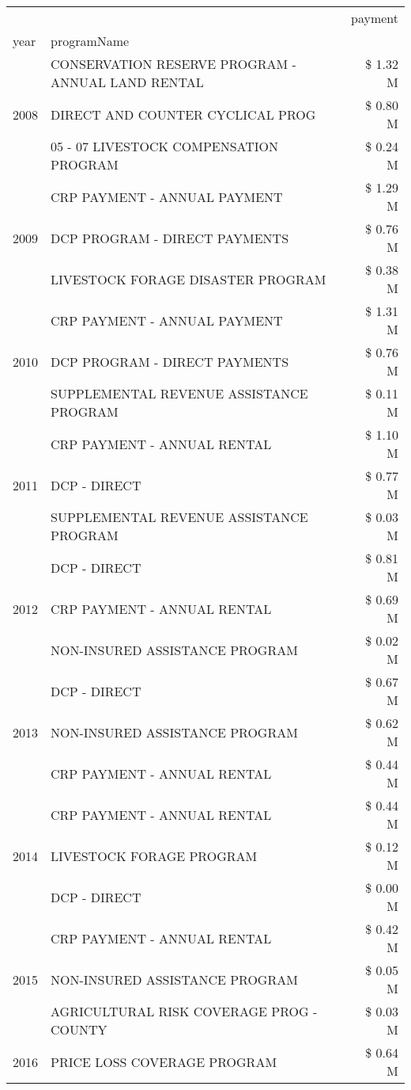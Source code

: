 \begin{tabular}{llr}
\toprule
 &  & payment \\
year & programName &  \\
\midrule
\multirow[t]{3}{*}{2008} & CONSERVATION RESERVE PROGRAM - ANNUAL LAND RENTAL & \$ 1.32 M \\
 & DIRECT AND COUNTER CYCLICAL PROG & \$ 0.80 M \\
 & 05 - 07 LIVESTOCK COMPENSATION PROGRAM & \$ 0.24 M \\
\cline{1-3}
\multirow[t]{3}{*}{2009} & CRP PAYMENT - ANNUAL PAYMENT & \$ 1.29 M \\
 & DCP PROGRAM - DIRECT PAYMENTS & \$ 0.76 M \\
 & LIVESTOCK FORAGE DISASTER  PROGRAM & \$ 0.38 M \\
\cline{1-3}
\multirow[t]{3}{*}{2010} & CRP PAYMENT - ANNUAL PAYMENT & \$ 1.31 M \\
 & DCP PROGRAM - DIRECT PAYMENTS & \$ 0.76 M \\
 & SUPPLEMENTAL REVENUE ASSISTANCE PROGRAM & \$ 0.11 M \\
\cline{1-3}
\multirow[t]{3}{*}{2011} & CRP PAYMENT - ANNUAL RENTAL & \$ 1.10 M \\
 & DCP - DIRECT & \$ 0.77 M \\
 & SUPPLEMENTAL REVENUE ASSISTANCE PROGRAM & \$ 0.03 M \\
\cline{1-3}
\multirow[t]{3}{*}{2012} & DCP - DIRECT & \$ 0.81 M \\
 & CRP PAYMENT - ANNUAL RENTAL & \$ 0.69 M \\
 & NON-INSURED ASSISTANCE PROGRAM & \$ 0.02 M \\
\cline{1-3}
\multirow[t]{3}{*}{2013} & DCP - DIRECT & \$ 0.67 M \\
 & NON-INSURED ASSISTANCE PROGRAM & \$ 0.62 M \\
 & CRP PAYMENT - ANNUAL RENTAL & \$ 0.44 M \\
\cline{1-3}
\multirow[t]{3}{*}{2014} & CRP PAYMENT - ANNUAL RENTAL & \$ 0.44 M \\
 & LIVESTOCK FORAGE PROGRAM & \$ 0.12 M \\
 & DCP - DIRECT & \$ 0.00 M \\
\cline{1-3}
\multirow[t]{3}{*}{2015} & CRP PAYMENT - ANNUAL RENTAL & \$ 0.42 M \\
 & NON-INSURED ASSISTANCE PROGRAM & \$ 0.05 M \\
 & AGRICULTURAL RISK COVERAGE PROG - COUNTY & \$ 0.03 M \\
\cline{1-3}
\multirow[t]{3}{*}{2016} & PRICE LOSS COVERAGE PROGRAM & \$ 0.64 M \\

\end{tabular}
